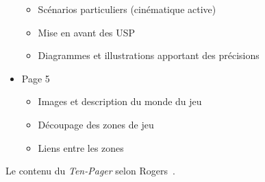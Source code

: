 \begin{table}
\begin{framed}
\begin{itemize}
\begin{itemize}
        \item Scénarios particuliers (cinématique active)
        \item Mise en avant des USP
        \item Diagrammes et illustrations apportant des précisions
    \end{itemize}
    \item Page 5
    \begin{itemize}
        \item Images et description du monde du jeu
        \item Découpage des zones de jeu
        \item Liens entre les zones
    \end{itemize}

\end{itemize}
\end{framed}
\caption{Le contenu du \emph{Ten-Pager} selon Rogers~\cite{LevelUpRogers2014}.}
\end{table}

\addtocounter{table}{-1}

